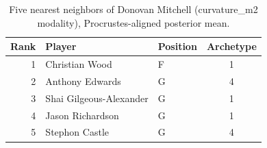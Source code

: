 \begin{table}[htbp]
  \centering\small
  \begin{tabular}{rllc}
    \toprule
    Rank & Player & Position & Archetype \\
    \midrule
    1 & Christian Wood & F & 1 \\
    2 & Anthony Edwards & G & 4 \\
    3 & Shai Gilgeous-Alexander & G & 1 \\
    4 & Jason Richardson & G & 1 \\
    5 & Stephon Castle & G & 4 \\
    \bottomrule
  \end{tabular}
  \caption{Five nearest neighbors of Donovan Mitchell (curvature_m2 modality), Procrustes-aligned posterior mean.}
  \label{tab:Donovan_Mitchell_neighbors_curvature_m2}
\end{table}

